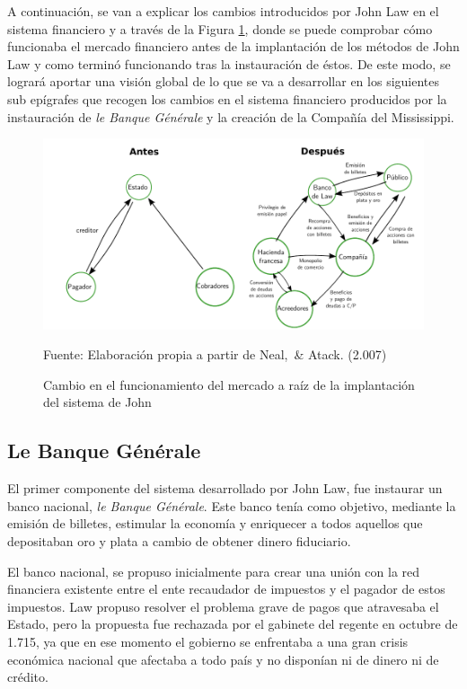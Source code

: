 A continuación, se van a explicar los cambios introducidos por John Law en el sistema financiero y a través de la Figura \ref{fig:grafoMercadoLaw}, donde se puede comprobar cómo funcionaba el mercado financiero antes de la implantación de los métodos de John Law y como terminó funcionando tras la instauración de éstos. De este modo, se logrará  aportar una visión global de lo que se va a desarrollar en los siguientes sub epígrafes que recogen los cambios en el sistema financiero producidos por la instauración de  \emph{le Banque Générale} y la creación de la Compañía del Mississippi. 

\begin{figure}[!h] 
\caption{Cambio en el funcionamiento del mercado a raíz de la implantación del sistema de John} 
\centering \includegraphics[width=150mm]{capitulos/graficos/grafoMercadoLaw} 
\label{fig:grafoMercadoLaw}

	\footnotesize
	Fuente: Elaboración propia a partir de Neal, \& Atack. (2.007)

\end{figure}

\subsection{Le Banque Générale}
El primer componente del sistema desarrollado por John Law, fue instaurar un banco nacional,  \emph{le Banque Générale}. Este banco tenía como objetivo, mediante la emisión de billetes, estimular la economía y enriquecer a todos aquellos que depositaban oro y plata a cambio de obtener dinero fiduciario. 

El banco nacional, se propuso inicialmente para crear una unión con la red financiera existente entre el ente recaudador de impuestos y el pagador de estos impuestos. Law propuso resolver el problema grave de pagos que atravesaba el Estado, pero la propuesta fue rechazada por el gabinete del regente en octubre de 1.715, ya que en ese momento el gobierno se enfrentaba a una gran crisis económica nacional que afectaba a todo país y no disponían ni de dinero ni de crédito. 

